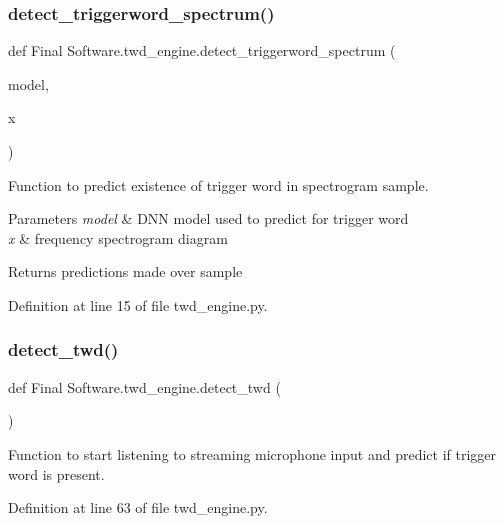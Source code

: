 \subsubsection{detect\_triggerword\_spectrum()}
{\footnotesize\ttfamily def Final Software.\+twd\+\_\+engine.\+detect\+\_\+triggerword\+\_\+spectrum (\begin{DoxyParamCaption}\item[{}]{model,  }\item[{}]{x }\end{DoxyParamCaption})}



Function to predict existence of trigger word in spectrogram sample. 


\begin{DoxyParams}{Parameters}
{\em model} & D\+NN model used to predict for trigger word \\
\hline
{\em x} & frequency spectrogram diagram \\
\hline
\end{DoxyParams}
\begin{DoxyReturn}{Returns}
predictions made over sample 
\end{DoxyReturn}


Definition at line 15 of file twd\+\_\+engine.\+py.

\mbox{\label{namespace_final_01_software_1_1twd__engine_a43daac36be0a5bc88b2d2cca216b2dad}} 
\subsubsection{detect\_twd()}
{\footnotesize\ttfamily def Final Software.\+twd\+\_\+engine.\+detect\+\_\+twd (\begin{DoxyParamCaption}{ }\end{DoxyParamCaption})}



Function to start listening to streaming microphone input and predict if trigger word is present. 



Definition at line 63 of file twd\+\_\+engine.\+py.

\mbox{\label{namespace_final_01_software_1_1twd__engine_a092b21d1e6d75d07e319698e7f203005}} 
